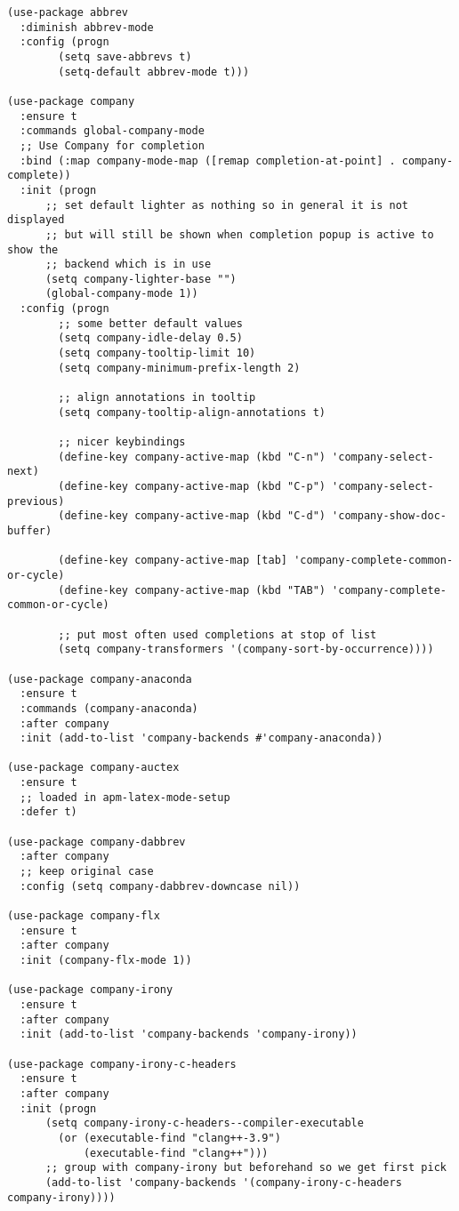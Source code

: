 \documentclass[11pt]{article}
\begin{document}
\begin{verbatim}
(use-package abbrev
  :diminish abbrev-mode
  :config (progn
	    (setq save-abbrevs t)
	    (setq-default abbrev-mode t)))

(use-package company
  :ensure t
  :commands global-company-mode
  ;; Use Company for completion
  :bind (:map company-mode-map ([remap completion-at-point] . company-complete))
  :init (progn
	  ;; set default lighter as nothing so in general it is not displayed
	  ;; but will still be shown when completion popup is active to show the
	  ;; backend which is in use
	  (setq company-lighter-base "")
	  (global-company-mode 1))
  :config (progn
	    ;; some better default values
	    (setq company-idle-delay 0.5)
	    (setq company-tooltip-limit 10)
	    (setq company-minimum-prefix-length 2)

	    ;; align annotations in tooltip
	    (setq company-tooltip-align-annotations t)

	    ;; nicer keybindings
	    (define-key company-active-map (kbd "C-n") 'company-select-next)
	    (define-key company-active-map (kbd "C-p") 'company-select-previous)
	    (define-key company-active-map (kbd "C-d") 'company-show-doc-buffer)

	    (define-key company-active-map [tab] 'company-complete-common-or-cycle)
	    (define-key company-active-map (kbd "TAB") 'company-complete-common-or-cycle)

	    ;; put most often used completions at stop of list
	    (setq company-transformers '(company-sort-by-occurrence))))

(use-package company-anaconda
  :ensure t
  :commands (company-anaconda)
  :after company
  :init (add-to-list 'company-backends #'company-anaconda))

(use-package company-auctex
  :ensure t
  ;; loaded in apm-latex-mode-setup
  :defer t)

(use-package company-dabbrev
  :after company
  ;; keep original case
  :config (setq company-dabbrev-downcase nil))

(use-package company-flx
  :ensure t
  :after company
  :init (company-flx-mode 1))

(use-package company-irony
  :ensure t
  :after company
  :init (add-to-list 'company-backends 'company-irony))

(use-package company-irony-c-headers
  :ensure t
  :after company
  :init (progn
	  (setq company-irony-c-headers--compiler-executable
		(or (executable-find "clang++-3.9")
		    (executable-find "clang++")))
	  ;; group with company-irony but beforehand so we get first pick
	  (add-to-list 'company-backends '(company-irony-c-headers company-irony))))


\end{verbatim}
\end{document}
